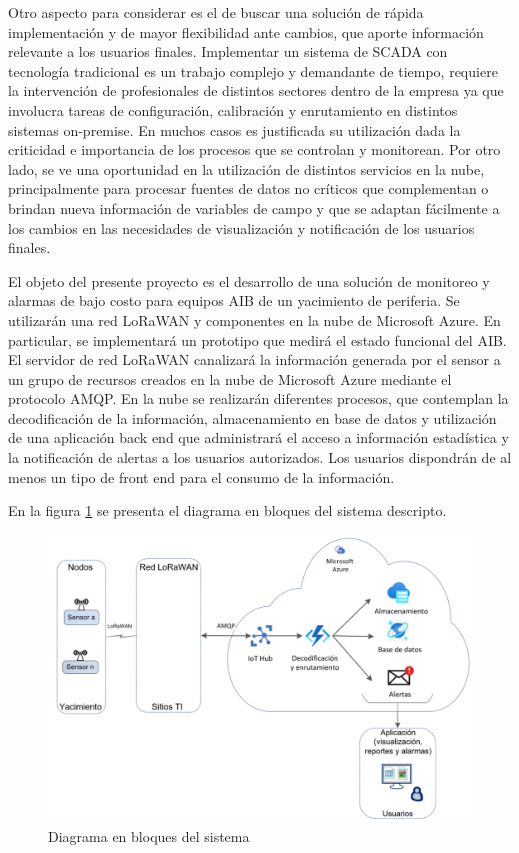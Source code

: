 \documentclass[
11pt, %
]{charter}
\begin{document}
Otro aspecto para considerar es el de buscar una solución de rápida implementación y de mayor flexibilidad ante cambios, que aporte información relevante a los usuarios finales. Implementar un sistema de SCADA con tecnología tradicional es un trabajo complejo y demandante de tiempo, requiere la intervención de profesionales de distintos sectores dentro de la empresa ya que involucra tareas de configuración, calibración y enrutamiento en distintos sistemas on-premise. En muchos casos es justificada su utilización dada la criticidad e importancia de los procesos que se controlan y monitorean. Por otro lado, se ve una oportunidad en la utilización de distintos servicios en la nube, principalmente para procesar fuentes de datos no críticos que complementan o brindan nueva información de variables de campo y que se adaptan fácilmente a los cambios en las necesidades de visualización y notificación de los usuarios finales.

El objeto del presente proyecto es el desarrollo de una solución de monitoreo y alarmas de bajo costo para equipos AIB de un yacimiento de periferia. Se utilizarán una red LoRaWAN y componentes en la nube de Microsoft Azure.
En particular, se implementará un prototipo que medirá el estado funcional del AIB. El servidor de red LoRaWAN canalizará la información generada por el sensor a un grupo de recursos creados en la nube de Microsoft Azure mediante el protocolo AMQP.
En la nube se realizarán diferentes procesos, que contemplan la decodificación de la información, almacenamiento en base de datos y utilización de una aplicación back end que administrará el acceso a información estadística y la notificación de alertas a los usuarios autorizados.
Los usuarios dispondrán de al menos un tipo de front end para el consumo de la información.

En la figura \ref{fig:diagBloques} se presenta el diagrama en bloques del sistema descripto.


\begin{figure}[htpb]
\centering 
\includegraphics[width=.8\textwidth]{./Figuras/diagrama_bloques_conceptual2.png}
\caption{Diagrama en bloques del sistema}
\label{fig:diagBloques}
\end{figure}
\end{document}
